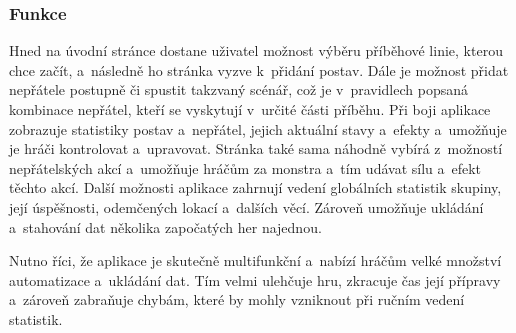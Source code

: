 \subsubsection*{Funkce}
Hned na úvodní stránce dostane uživatel možnost výběru příběhové linie, kterou chce začít, a~následně ho stránka vyzve k~přidání postav. Dále je možnost přidat nepřátele postupně či spustit takzvaný scénář, což je v~pravidlech popsaná kombinace nepřátel, kteří se vyskytují v~určité části příběhu. Při boji aplikace zobrazuje statistiky postav a~nepřátel, jejich aktuální stavy a~efekty a~umožňuje je hráči kontrolovat a~upravovat. Stránka také sama náhodně vybírá z~možností nepřátelských akcí a~umožňuje hráčům za monstra  a~tím udávat sílu a~efekt těchto akcí. Další možnosti aplikace zahrnují vedení globálních statistik skupiny, její úspěšnosti, odemčených lokací a~dalších věcí. Zároveň umožňuje ukládání a~stahování dat několika započatých her najednou.

Nutno říci, že aplikace je skutečně multifunkční a~nabízí hráčům velké množství automatizace a~ukládání dat. Tím velmi ulehčuje hru, zkracuje čas její přípravy a~zároveň zabraňuje chybám, které by mohly vzniknout při ručním vedení statistik.
